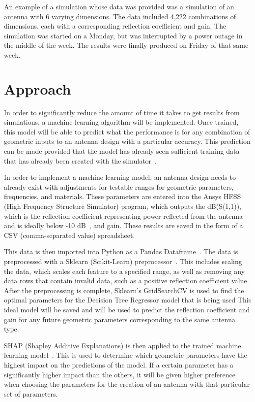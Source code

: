 \documentclass[12pt, letterpaper, notitlepage]{article}
\begin{document}
An example of a simulation whose data was provided was a simulation of an antenna with 6 varying dimensions. The data included 4,222 combinations of dimensions, each with a corresponding reflection coefficient and gain. The simulation was started on a Monday, but was interrupted by a power outage in the middle of the week. The results were finally produced on Friday of that same week.

\section*{Approach}
In order to significantly reduce the amount of time it takes to get results from simulations, a machine learning algorithm will be implemented. Once trained, this model will be able to predict what the performance is for any combination of geometric inputs to an antenna design with a particular accuracy. This prediction can be made provided that the model has already seen sufficient training data that has already been created with the simulator~\cite{Naseri_2021}.

In order to implement a machine learning model, an antenna design needs to already exist with adjustments for testable ranges for geometric parameters, frequencies, and materials. These parameters are entered into the Ansys HFSS (High Frequency Structure Simulator) program, which outputs the dB(S(1,1)), which is the reflection coefficient representing power reflected from the antenna and is ideally below -10 dB~\cite{Bevelacqua_2015}, and gain. These results are saved in the form of a CSV (comma-separated value) spreadsheet.

This data is then imported into Python as a Pandas Dataframe~\cite{reback2020pandas}. The data is preprocessed with a Sklearn (Scikit-Learn) preprocessor~\cite{scikit-learn}. This includes scaling the data, which scales each feature to a specified range, as well as removing any data rows that contain invalid data, such as a positive reflection coefficient value. After the preprocessing is complete, Sklearn's GridSearchCV is used to find the optimal parameters for the Decision Tree Regressor model that is being used This ideal model will be saved and will be used to predict the reflection coefficient and gain for any future geometric parameters corresponding to the same antenna type.

SHAP (Shapley Additive Explanations) is then applied to the trained machine learning model~\cite{lundberg2017unified}. This is used to determine which geometric parameters have the highest impact on the predictions of the model. If a certain parameter has a significantly higher impact than the others, it will be given higher preference when choosing the parameters for the creation of an antenna with that particular set of parameters.
\end{document}

